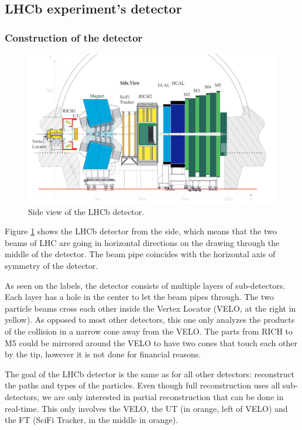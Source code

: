 \documentclass[12pt]{article}
\begin{document}
\subsection{LHCb experiment's detector}\label{sec_lhcb_detector}
	
\subsubsection{Construction of the detector}\label{sec_lhcb_det_constr}

\begin{figure}[H]
	\includegraphics[width=\textwidth]{lhcb_geometry_upgrade}
	\caption{Side view of the LHCb detector.}
	\label{fig_lhcb_geometry}
\end{figure}

Figure \ref{fig_lhcb_geometry} shows the LHCb detector from the side, which means that the two beams of LHC are going in horizontal directions on the drawing through the middle of the detector. The beam pipe coincides with the horizontal axis of symmetry of the detector.

As seen on the labels, the detector consists of multiple layers of sub-detectors. Each layer has a hole in the center to let the beam pipes through. The two particle beams cross each other inside the Vertex Locator (VELO, at the right in yellow). As opposed to most other detectors, this one only analyzes the products of the collision in a narrow cone away from the VELO. The parts from RICH to M5 could be mirrored around the VELO to have two cones that touch each other by the tip, however it is not done for financial reasons.

The goal of the LHCb detector is the same as for all other detectors: reconstruct the paths and types of the particles. Even though full reconstruction uses all sub-detectors, we are only interested in partial reconstruction that can be done in real-time. This only involves the VELO, the UT (in orange, left of VELO) and the FT (SciFi Tracker, in the middle in orange).
\end{document}
